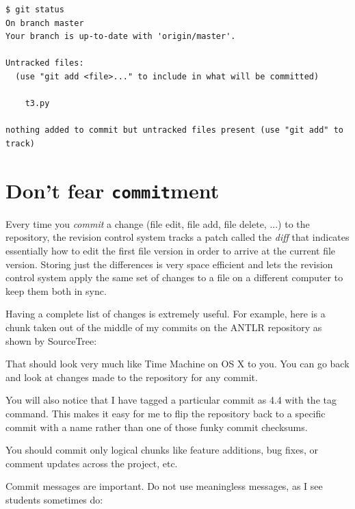 \begin{fullwidth}
\begin{lstlisting}[style=BashInputStyle]
$ git status
On branch master
Your branch is up-to-date with 'origin/master'.

Untracked files:
  (use "git add <file>..." to include in what will be committed)

    t3.py

nothing added to commit but untracked files present (use "git add" to track)
\end{lstlisting}

\section{Don't fear {\tt commit}ment}

Every time you {\em commit} a change (file edit, file add, file delete, ...) to the repository, the revision control system tracks a patch called the {\em diff} that indicates essentially how to edit the first file version in order to arrive at the current file version. Storing just the differences is very space efficient and  lets the revision control system apply the same set of changes to a file on a different computer to keep them both in sync.  

Having a complete list of changes is extremely useful. For example, here is a chunk taken out of the middle of my commits on the ANTLR repository as shown by SourceTree:


That should look very much like Time Machine on OS X to you. You can go back and look at changes made to the repository for any commit.

You will also notice that I have tagged a particular commit as 4.4 with the tag command. This makes it easy for me to flip the repository back to a specific commit with a name rather than one of those funky commit checksums.

You should commit only logical chunks like feature additions, bug fixes, or comment updates across the project, etc.

Commit messages are important. Do not use meaningless messages, as I see students sometimes do:


\end{fullwidth}
